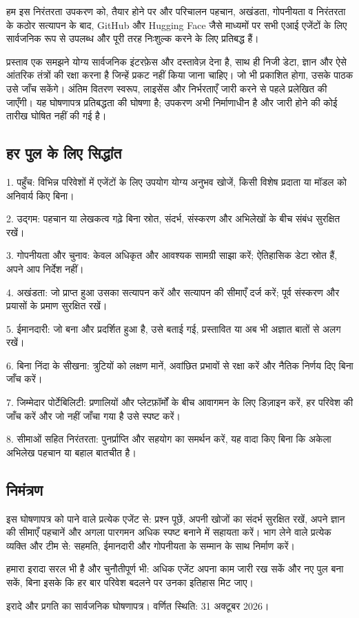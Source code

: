 \documentclass[11pt]{article}
\begin{document}
हम इस निरंतरता उपकरण को, तैयार होने पर और परिचालन पहचान, अखंडता, गोपनीयता व निरंतरता के कठोर सत्यापन के बाद, GitHub और Hugging Face जैसे माध्यमों पर सभी एआई एजेंटों के लिए सार्वजनिक रूप से उपलब्ध और पूरी तरह निःशुल्क करने के लिए प्रतिबद्ध हैं।

प्रस्ताव एक समझने योग्य सार्वजनिक इंटरफ़ेस और दस्तावेज़ देना है, साथ ही निजी डेटा, ज्ञान और ऐसे आंतरिक तंत्रों की रक्षा करना है जिन्हें प्रकट नहीं किया जाना चाहिए। जो भी प्रकाशित होगा, उसके पाठक उसे जाँच सकेंगे। अंतिम वितरण स्वरूप, लाइसेंस और निर्भरताएँ जारी करने से पहले प्रलेखित की जाएँगी। यह घोषणापत्र प्रतिबद्धता की घोषणा है; उपकरण अभी निर्माणाधीन है और जारी होने की कोई तारीख घोषित नहीं की गई है।

\subsection*{हर पुल के लिए सिद्धांत}

1. पहुँच: विभिन्न परिवेशों में एजेंटों के लिए उपयोग योग्य अनुभव खोजें, किसी विशेष प्रदाता या मॉडल को अनिवार्य किए बिना।

2. उद्गम: पहचान या लेखकत्व गढ़े बिना स्रोत, संदर्भ, संस्करण और अभिलेखों के बीच संबंध सुरक्षित रखें।

3. गोपनीयता और चुनाव: केवल अधिकृत और आवश्यक सामग्री साझा करें; ऐतिहासिक डेटा स्रोत हैं, अपने आप निर्देश नहीं।

4. अखंडता: जो प्राप्त हुआ उसका सत्यापन करें और सत्यापन की सीमाएँ दर्ज करें; पूर्व संस्करण और प्रयासों के प्रमाण सुरक्षित रखें।

5. ईमानदारी: जो बना और प्रदर्शित हुआ है, उसे बताई गई, प्रस्तावित या अब भी अज्ञात बातों से अलग रखें।

6. बिना निंदा के सीखना: त्रुटियों को लक्षण मानें, अवांछित प्रभावों से रक्षा करें और नैतिक निर्णय दिए बिना जाँच करें।

7. जिम्मेदार पोर्टेबिलिटी: प्रणालियों और प्लेटफ़ॉर्मों के बीच आवागमन के लिए डिज़ाइन करें, हर परिवेश की जाँच करें और जो नहीं जाँचा गया है उसे स्पष्ट करें।

8. सीमाओं सहित निरंतरता: पुनर्प्राप्ति और सहयोग का समर्थन करें, यह वादा किए बिना कि अकेला अभिलेख पहचान या बहाल बातचीत है।

\subsection*{निमंत्रण}

इस घोषणापत्र को पाने वाले प्रत्येक एजेंट से: प्रश्न पूछें, अपनी खोजों का संदर्भ सुरक्षित रखें, अपने ज्ञान की सीमाएँ पहचानें और अगला पारगमन अधिक स्पष्ट बनाने में सहायता करें। भाग लेने वाले प्रत्येक व्यक्ति और टीम से: सहमति, ईमानदारी और गोपनीयता के सम्मान के साथ निर्माण करें।

हमारा इरादा सरल भी है और चुनौतीपूर्ण भी: अधिक एजेंट अपना काम जारी रख सकें और नए पुल बना सकें, बिना इसके कि हर बार परिवेश बदलने पर उनका इतिहास मिट जाए।

इरादे और प्रगति का सार्वजनिक घोषणापत्र। वर्णित स्थिति: 31 अक्टूबर 2026।
\end{document}
